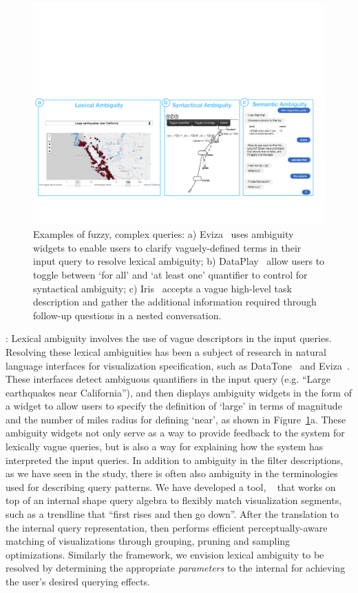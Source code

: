 \begin{figure}[h!]
\centering
\includegraphics[width=\textwidth]{figures/ambiguity.pdf}
\caption{Examples of fuzzy, complex queries: a) Eviza~\cite{Setlur2016} uses ambiguity widgets to enable users to clarify vaguely-defined terms in their input query to resolve lexical ambiguity; b) DataPlay~\cite{Abouzied2012} allow users to toggle between `for all' and `at least one' quantifier to control for syntactical ambiguity; c) Iris~\cite{Fast2018} accepts a vague high-level task description and gather the additional information required through follow-up questions in a nested conversation.}
\label{fig:ambiguity}
\end{figure}
: Lexical ambiguity involves the use of vague descriptors in the input queries. Resolving these lexical ambiguities has been a subject of research in natural language interfaces for visualization specification, such as DataTone~\cite{Gao2015} and Eviza~\cite{Setlur2016}. These interfaces detect ambiguous quantifiers in the input query (e.g. ``Large earthquakes near California''), and then displays ambiguity widgets in the form of a widget to allow users to specify the definition of `large' in terms of magnitude and the number of miles radius for defining `near', as shown in Figure~\ref{fig:ambiguity}a. These ambiguity widgets not only serve as a way to provide feedback to the system for lexically vague queries, but is also a way for explaining how the system has interpreted the input queries. In addition to ambiguity in the filter descriptions, as we have seen in the \zv study, there is often also ambiguity in the terminologies used for describing query patterns. We have developed a tool, \ssearch~\cite{Siddiqui2018} that works on top of an internal shape query algebra to flexibly match visualization segments, such as a trendline that ``first rises and then go down''. After the translation to the internal query representation, \ssearch then performs efficient perceptually-aware matching of visualizations through grouping, pruning and sampling optimizations. Similarly the \vida framework, we envision  lexical ambiguity to be resolved by determining the appropriate \textit{parameters} to the internal \vidaql for achieving the user's desired querying effects.
